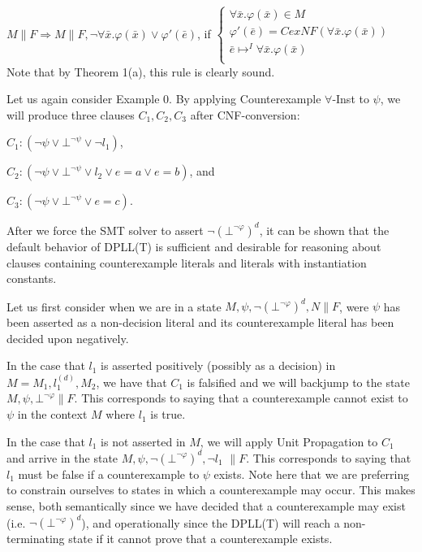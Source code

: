 \documentclass{llncs}
\begin{document}
$M \parallel F \Longrightarrow M \parallel F, \neg \forall \bar{x}. \varphi( \bar{ x } ) \vee \varphi'( \bar{ e } )$, if   
$\begin{cases}
  \forall \bar{x}. \varphi( \bar{ x } ) \in M \\
  \varphi'( \bar{ e } ) = CexNF( \forall \bar{x}. \varphi( \bar{ x } ) ) \\
  \bar{ e } \mapsto^I \forall \bar{x}. \varphi( \bar{ x } ) \\
\end{cases}$ \\

Note that by Theorem 1(a), this rule is clearly sound.

Let us again consider Example 0.
By applying Counterexample $\forall$-Inst to $\psi$, we will produce three clauses $C_1, C_2, C_3$ after CNF-conversion:

$C_1 : ( \neg \psi \vee \bot^{\neg \psi} \vee \neg l_1)$,

$C_2 : ( \neg \psi \vee \bot^{\neg \psi} \vee l_2 \vee e = a \vee e = b )$, and

$C_3 : ( \neg \psi \vee \bot^{\neg \psi} \vee e = c )$.

After we force the SMT solver to assert $\neg( \bot^{\neg \varphi} )^d$, it can be shown that the default behavior of DPLL(T) is sufficient and desirable for reasoning about clauses containing counterexample literals and literals with instantiation constants.

Let us first consider when we are in a state $M, \psi, \neg( \bot^{\neg \varphi} )^d, N \parallel F$, were $\psi$ has been asserted as a non-decision literal and its counterexample literal has been decided upon negatively.

In the case that $l_1$ is asserted positively (possibly as a decision) in $M = M_1, l^{(d)}_1, M_2$, we have that $C_1$ is falsified and we will backjump to the state $M, \psi, \bot^{\neg \varphi} \parallel F$.
This corresponds to saying that a counterexample cannot exist to $\psi$ in the context $M$ where $l_1$ is true.

In the case that $l_1$ is not asserted in $M$, we will apply Unit Propagation to $C_1$ and arrive in the state $M, \psi, \neg( \bot^{\neg \varphi} )^d, \neg l_1$ $\parallel F$.
This corresponds to saying that $l_1$ must be false if a counterexample to $\psi$ exists.
Note here that we are preferring to constrain ourselves to states in which a counterexample may occur.
This makes sense, both semantically since we have decided that a counterexample may exist (i.e. $\neg( \bot^{\neg \varphi} )^d$), and operationally since the DPLL(T) will reach a non-terminating state if it cannot prove that a counterexample exists.
\end{document}
